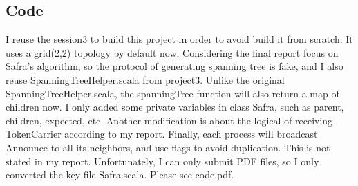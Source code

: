 \documentclass{article}
\begin{document}


\begin{appendices}
\section{Code}
I reuse the session3 to build this project in order to avoid build it from scratch. It uses a grid(2,2) topology by default now. Considering the final report focus on Safra's algorithm, so the protocol of generating spanning tree is fake, and I also reuse SpanningTreeHelper.scala from project3. Unlike the original SpanningTreeHelper.scala, the spanningTree function will also return a map of children now. I only added some private variables in class Safra, such as parent, children, expected, etc. Another modification is about the logical of receiving TokenCarrier according to my report. Finally, each process will broadcast Announce to all its neighbors, and use flags to avoid duplication. This is not stated in my report. Unfortunately, I can only submit PDF files, so I only converted the key file Safra.scala. Please see code.pdf.
\end{appendices}
\end{document}

